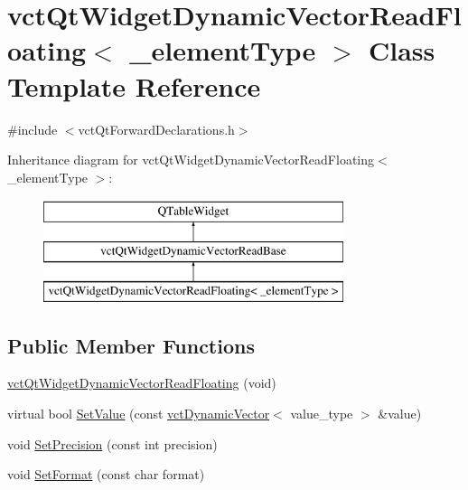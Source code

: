 \hypertarget{classvct_qt_widget_dynamic_vector_read_floating}{}\section{vct\+Qt\+Widget\+Dynamic\+Vector\+Read\+Floating$<$ \+\_\+element\+Type $>$ Class Template Reference}
\label{classvct_qt_widget_dynamic_vector_read_floating}


{\ttfamily \#include $<$vct\+Qt\+Forward\+Declarations.\+h$>$}

Inheritance diagram for vct\+Qt\+Widget\+Dynamic\+Vector\+Read\+Floating$<$ \+\_\+element\+Type $>$\+:\begin{figure}[H]
\begin{center}
\leavevmode
\includegraphics[height=3.000000cm]{d4/d5c/classvct_qt_widget_dynamic_vector_read_floating}
\end{center}
\end{figure}
\subsection*{Public Member Functions}
\begin{DoxyCompactItemize}
\item 
\hyperlink{classvct_qt_widget_dynamic_vector_read_floating_a9c567f667c0a2d59e9db6f29b6b3b9ef}{vct\+Qt\+Widget\+Dynamic\+Vector\+Read\+Floating} (void)
\item 
virtual bool \hyperlink{classvct_qt_widget_dynamic_vector_read_floating_a1a7cf8f2f7acdf9f788789fbbbfb0ac4}{Set\+Value} (const \hyperlink{classvct_dynamic_vector}{vct\+Dynamic\+Vector}$<$ value\+\_\+type $>$ \&value)
\item 
void \hyperlink{classvct_qt_widget_dynamic_vector_read_floating_a0a2b96322cc857e357366fb8fc61d053}{Set\+Precision} (const int precision)
\item 
void \hyperlink{classvct_qt_widget_dynamic_vector_read_floating_aba4eaf5f416bc92ea6048d7f0dd1180b}{Set\+Format} (const char format)
\end{DoxyCompactItemize}


